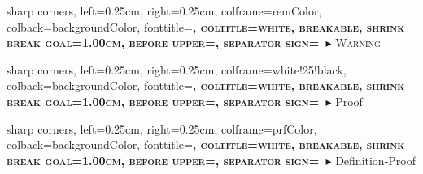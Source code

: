\newenvironment{construction}[2]{%
    \begin{tcbconstruction}[label={#2}]{{\fontsize{10}{12}\selectfont\hyperwhite\textsc{\bfseries#1}}}{}\hyperred%
}
{
    \end{tcbconstruction}
}
%
{%
sharp corners,
left=0.25cm,
right=0.25cm,
colframe=remColor,
colback=backgroundColor,
fonttitle=\bfseries\scshape\SmallCapsFont,
coltitle=white,
breakable,
shrink break goal=1.00cm,
before upper={},
separator sign={\ $\blacktriangleright$}%
}{\textsc{Warning}}

\newenvironment{warning}[2]{
    \begin{tcbwarning}[label={#2}]{{\fontsize{10}{12}\selectfont\hyperwhite\textsc{\bfseries#1}}}{}\hyperred
    \begin{dnote}
}
{
    \end{dnote}
    \end{tcbwarning}
}


%
{%
sharp corners,
left=0.25cm,
right=0.25cm,
colframe=white!25!black,
colback=backgroundColor,
fonttitle=\bfseries\scshape\SmallCapsFont,
coltitle=white,
breakable,
shrink break goal=1.00cm,
before upper={},
separator sign={\ $\blacktriangleright$}%
}{Proof}

\newenvironment{Proof}[1]{%
    \begin{tcbproof}{{\fontsize{10}{12}\selectfont\hyperwhite\textsc{\bfseries#1}}}{}\hyperred%
}%
{%
    \hfill%
    $\smash{\texttt{[image: ../../pictures/trans-flag/trans-flag.pdf]}}$%
    \end{tcbproof}\hyperred%
}%

%
{%
sharp corners,
left=0.25cm,
right=0.25cm,
colframe=prfColor,
colback=backgroundColor,
fonttitle=\bfseries\scshape\SmallCapsFont,
coltitle=white,
breakable,
shrink break goal=1.00cm,
before upper={},
separator sign={\ $\blacktriangleright$}%
}{Definition-Proof}

